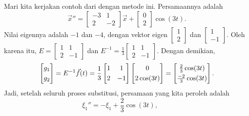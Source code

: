 \begin{example}
Mari kita kerjakan contoh dari  dengan metode ini.
Persamaannya adalah
\begin{equation*}
{\vec{x}}'' =
\begin{bmatrix}
-3 & 1 \\
2 & -2
\end{bmatrix}
\vec{x} 
+ 
\begin{bmatrix}
0 \\ 2
\end{bmatrix}
\cos (3 t) .
\end{equation*}
Nilai eigennya adalah $-1$ dan $-4$, dengan vektor eigen 
$\left[ \begin{smallmatrix} 1 \\ 2 \end{smallmatrix} \right]$ dan
$\left[ \begin{smallmatrix} 1 \\ -1 \end{smallmatrix} \right]$.
Oleh karena itu, $E =
\left[ \begin{smallmatrix} 1 & 1 \\ 2 & -1 \end{smallmatrix} \right]$
dan
$E^{-1} =
\frac{1}{3}
\left[ \begin{smallmatrix} 1 & 1 \\ 2 & -1 \end{smallmatrix}
\right]$.
Dengan demikian,
\begin{equation*}
\begin{bmatrix}
g_1 \\
\noalign{\smallskip}
g_2
\end{bmatrix}
=
E^{-1} \vec{f}(t)
=
\frac{1}{3}
\begin{bmatrix} 1 & 1 \\
\noalign{\smallskip}
2 & -1 \end{bmatrix}
\begin{bmatrix} 0 \\
\noalign{\smallskip}
2\cos (3t) \end{bmatrix}
=
\begin{bmatrix} \frac{2}{3}\cos (3t)
\\
\noalign{\smallskip}
\frac{-2}{3}\cos (3t) \end{bmatrix} .
\end{equation*}
Jadi, setelah seluruh proses substitusi, persamaan yang kita peroleh adalah
\begin{equation*}
\xi_1'' = - \xi_1 + \frac{2}{3} \cos (3t) , \qquad

\end{equation*}
\end{example}
